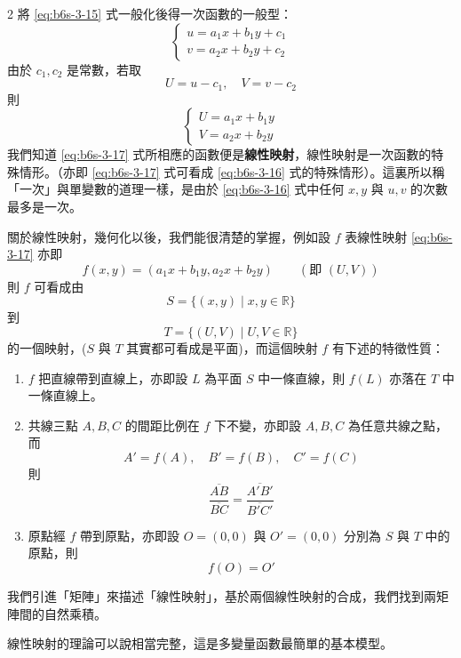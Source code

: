 \begin{paracol}{2}
將 \eqref{eq:b6s-3-15} 式一般化後得一次函數的一般型：
\begin{equation}
\begin{cases} u = a_1 x + b_1 y + c_1 \\ v = a_2 x + b_2 y + c_2 \end{cases} \label{eq:b6s-3-16}
\end{equation}
由於 $c_1, c_2$ 是常數，若取
\[ U = u - c_1, \quad V = v - c_2 \]
則
\begin{equation}
\begin{cases} U = a_1 x + b_1 y \\ V = a_2 x + b_2 y \end{cases} \label{eq:b6s-3-17}
\end{equation}
我們知道 \eqref{eq:b6s-3-17} 式所相應的函數便是\textbf{線性映射}，線性映射是一次函數的特殊情形。（亦即 \eqref{eq:b6s-3-17} 式可看成 \eqref{eq:b6s-3-16} 式的特殊情形）。這裏所以稱「一次」與單變數的道理一樣，是由於 \eqref{eq:b6s-3-16} 式中任何 $x, y$ 與 $u, v$ 的次數最多是一次。

關於線性映射，幾何化以後，我們能很清楚的掌握，例如設 $f$ 表線性映射 \eqref{eq:b6s-3-17} 亦即
\[ f(x, y) = (a_1 x + b_1 y, a_2 x + b_2 y) \qquad (\text{即 } (U, V)) \]
則 $f$ 可看成由
\[ S = \{ (x,y) \mid x, y \in \mathbb{R} \} \]
到
\[ T = \{ (U,V) \mid U, V \in \mathbb{R} \} \]
的一個映射，($S$ 與 $T$ 其實都可看成是平面)，而這個映射 $f$ 有下述的特徵性質：
\begin{enumerate}[label=(\roman*), leftmargin=2em]
  \item $f$ 把直線帶到直線上，亦即設 $L$ 為平面 $S$ 中一條直線，則 $f(L)$ 亦落在 $T$ 中一條直線上。
  \item 共線三點 $A, B, C$ 的間距比例在 $f$ 下不變，亦即設 $A, B, C$ 為任意共線之點，而
  \[ A' = f(A), \quad B' = f(B), \quad C' = f(C) \]
  則
  \[ \dfrac{\overline{AB}}{\overline{BC}} = \dfrac{\overline{A'B'}}{\overline{B'C'}} \]
  \item 原點經 $f$ 帶到原點，亦即設 $O=(0,0)$ 與 $O'=(0,0)$ 分別為 $S$ 與 $T$ 中的原點，則
  \[ f(O) = O' \]
\end{enumerate}

我們引進「矩陣」來描述「線性映射」，基於兩個線性映射的合成，我們找到兩矩陣間的自然乘積。

線性映射的理論可以說相當完整，這是多變量函數最簡單的基本模型。

\switchcolumn


\end{paracol}
